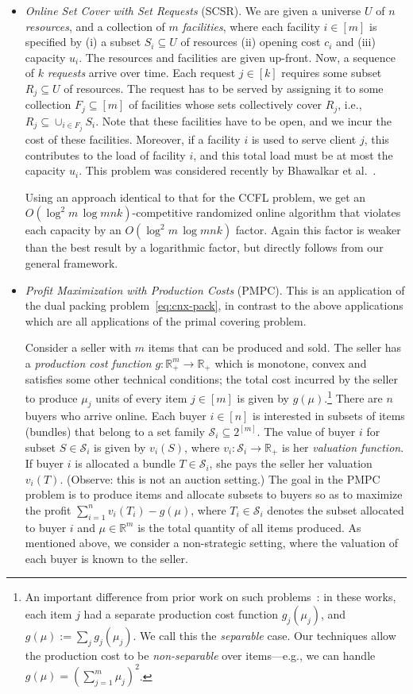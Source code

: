 \documentclass[letterpaper,11pt]{article}
\def \RR   {{\mathbb R}}
\def\cS{\mathcal{S}}
\def\sse{\subseteq}
\begin{document}
\begin{itemize}
\item {\em Online Set Cover with Set Requests} (SCSR).  We are given a
  universe $U$ of $n$ \emph{resources}, and a collection of $m$
  \emph{facilities}, where each facility $i\in[m]$ is specified by (i) a
  subset $S_i\sse U$ of resources (ii) opening cost $c_i$ and (iii)
  capacity $u_i$. The resources and facilities are given up-front. Now,
  a sequence of $k$ {\em requests} arrive over time. Each request
  $j\in[k]$ requires some subset $R_j\sse U$ of resources. The request
  has to be served by assigning it to some collection $F_j \sse [m]$ of
  facilities whose sets collectively cover $R_j$, i.e., $R_j\sse
  \cup_{i\in F_j} S_i$. Note that these facilities have to be open, and
  we incur the cost of these facilities. Moreover, if a facility $i$ is
  used to serve client $j$, this contributes to the load of facility
  $i$, and this total load must be at most the capacity $u_i$.  This
  problem was considered recently by Bhawalkar et al.~\cite{BGP14}.

  Using an approach identical to that for the CCFL problem, we get an
  $O(\log^2m\,\log mnk)$-competitive randomized online algorithm that
  violates each capacity by an $O(\log^2m\,\log mnk)$ factor. Again this
  factor is weaker than the best result by a logarithmic factor, but
  directly follows from our general framework.

\item {\em Profit Maximization with Production Costs} (PMPC).
This is an application of the dual packing problem~\eqref{eq:cnx-pack}, in contrast to the above applications which are all applications of the primal covering problem.

  Consider a seller with $m$ items that can be produced and sold.  The seller has a \emph{production cost function} $g:\RR_+^m\rightarrow \RR_+$ which is monotone, convex and satisfies some other technical conditions; the total cost incurred by the seller to produce $\mu_j$ units of every item $j\in [m]$ is given by $g(\mu)$.\footnote{An important difference from prior work on such problems~\cite{BGMS11,HK15}: in these works, each item $j$ had a separate production cost function $g_j(\mu_j)$, and $g(\mu) := \sum_j g_j(\mu_j)$. We call this the \emph{separable} case. Our techniques allow the production cost to be {\em non-separable} over items---e.g., we can handle $g(\mu)=(\sum_{j=1}^m \mu_j)^2$.}  There are $n$ buyers who arrive online. Each buyer $i\in[n]$ is interested in subsets of items (bundles) that belong to a set family $\cS_i \sse 2^{[m]}$. The value of buyer $i$ for subset $S \in \cS_i$ is given by $v_i(S)$, where $v_i:\cS_i\rightarrow \RR_+$ is her \emph{valuation function}. If buyer $i$ is allocated a bundle $T\in \cS_i$, she pays the seller her valuation $v_i(T)$. (Observe: this is not an auction setting.) The goal in the PMPC problem is to produce items and allocate subsets to buyers so as to maximize the profit $\sum_{i=1}^n v_i(T_i) - g(\mu)$, where $T_i\in \cS_i$ denotes the subset allocated to buyer $i$ and $\mu\in \RR^m$ is the total quantity of all items produced.  As mentioned above, we consider a non-strategic setting, where the valuation of each buyer is known to the seller.


\end{itemize}
\end{document}
